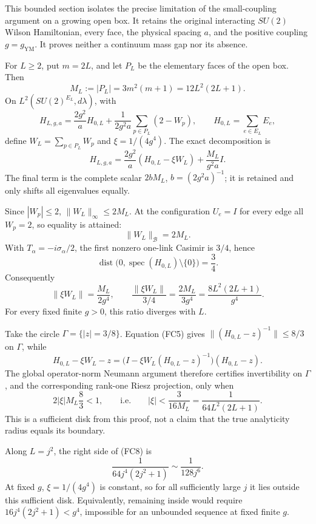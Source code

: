 \documentclass[
  11pt,
]{article}
\begin{document}
This bounded section isolates the precise limitation of the
small-coupling argument on a growing open box. It retains the original
interacting \(SU(2)\) Wilson Hamiltonian, every face, the physical
spacing \(a\), and the positive coupling \(g=g_{\mathrm{YM}}\). It
proves neither a continuum mass gap nor its absence.

For \(L\ge2\), put \(m=2L\), and let \(P_L\) be the elementary faces of
the open box. Then \[
 M_L:=|P_L|=3m^2(m+1)=12L^2(2L+1). \tag{FC1}
\] On \(L^2(SU(2)^{E_L},d\lambda)\), with \[
 H_{L,g,a}=\frac{2g^2}{a}H_{0,L}
 +\frac{1}{2g^2a}\sum_{p\in P_L}(2-W_p),\qquad
 H_{0,L}=\sum_{e\in E_L}E_e, \tag{FC2}
\] define \(W_L=\sum_{p\in P_L}W_p\) and \(\xi=1/(4g^4)\). The exact
decomposition is \[
 H_{L,g,a}=\frac{2g^2}{a}(H_{0,L}-\xi W_L)
 +\frac{M_L}{g^2a}I. \tag{FC3}
\] The final term is the complete scalar \(2bM_L\), \(b=(2g^2a)^{-1}\);
it is retained and only shifts all eigenvalues equally.

Since \(|W_p|\le2\), \(\|W_L\|_\infty\le2M_L\). At the configuration
\(U_e=I\) for every edge all \(W_p=2\), so equality is attained: \[
 \|W_L\|_{\mathcal B}=2M_L. \tag{FC4}
\] With \(T_\alpha=-i\sigma_\alpha/2\), the first nonzero one-link
Casimir is \(3/4\), hence \[
 \operatorname{dist}\bigl(0,\operatorname{spec}(H_{0,L})\setminus\{0\}\bigr)
 =\frac34. \tag{FC5}
\] Consequently \[
 \|\xi W_L\|=\frac{M_L}{2g^4},\qquad
 \frac{\|\xi W_L\|}{3/4}
 =\frac{2M_L}{3g^4}
 =\frac{8L^2(2L+1)}{g^4}. \tag{FC6}
\] For every fixed finite \(g>0\), this ratio diverges with \(L\).

Take the circle \(\Gamma=\{|z|=3/8\}\). Equation (FC5) gives
\(\|(H_{0,L}-z)^{-1}\|\le8/3\) on \(\Gamma\), while \[
 H_{0,L}-\xi W_L-z
 =\bigl(I-\xi W_L(H_{0,L}-z)^{-1}\bigr)(H_{0,L}-z). \tag{FC7}
\] The global operator-norm Neumann argument therefore certifies
invertibility on \(\Gamma\), and the corresponding rank-one Riesz
projection, only when \[
 2|\xi|M_L\frac83<1,\qquad\text{i.e.}\qquad
 \boxed{|\xi|<\frac{3}{16M_L}
 =\frac{1}{64L^2(2L+1)}.} \tag{FC8}
\] This is a sufficient disk from this proof, not a claim that the true
analyticity radius equals its boundary.

Along \(L=j^2\), the right side of (FC8) is \[
 \frac{1}{64j^4(2j^2+1)}\sim\frac{1}{128j^6}. \tag{FC9}
\] At fixed \(g\), \(\xi=1/(4g^4)\) is constant, so for all sufficiently
large \(j\) it lies outside this sufficient disk. Equivalently,
remaining inside would require \(16j^4(2j^2+1)<g^4\), impossible for an
unbounded sequence at fixed finite \(g\).
\end{document}
